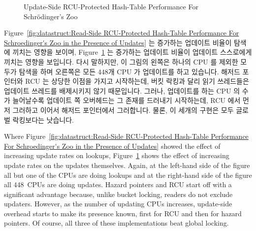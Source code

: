 \begin{figure}[tb]
\centering
{}
\caption{Update-Side RCU-Protected Hash-Table Performance For Schr\"odinger's Zoo}
\label{fig:datastruct:Update-Side RCU-Protected Hash-Table Performance For Schroedinger's Zoo}
\end{figure}

Figure~\ref{fig:datastruct:Read-Side RCU-Protected Hash-Table Performance For Schroedinger's Zoo in the Presence of Updates}
는 증가하는 업데이트 비율이 탐색에 끼치는 영향을 보이며,
Figure~\ref{fig:datastruct:Update-Side RCU-Protected Hash-Table Performance For Schroedinger's Zoo}
는 증가하는 업데이트 비율이 업데이트 스스로에게 끼치는 영향을 보입니다.
다시 말하지만, 이 그림의 왼쪽은 하나의 CPU 를 제외한 모두가 탐색을 하며
오른쪽은 모든 448개 CPU 가 업데이트를 하고 있습니다.
해저드 포인터와 RCU 는 상당한 이점을 가지고 시작하는데, 버킷 락킹과 달리 읽기
쓰레드들은 업데이트 쓰레드를 배제시키지 않기 때문입니다.
그러나, 업데이트를 하는 CPU 의 수가 늘어날수록 업데이트 쪽 오버헤드는 그 존재를
드러내기 시작하는데, RCU 에서 먼저 그러하고 이어서 해저드 포인터에서
그러합니다.
물론, 이 세개의 구현은 모두 글로벌 락킹보다는 낫습니다.

\iffalse

Where
Figure~\ref{fig:datastruct:Read-Side RCU-Protected Hash-Table Performance For Schroedinger's Zoo in the Presence of Updates}
showed the effect of increasing update rates on lookups,
Figure~\ref{fig:datastruct:Update-Side RCU-Protected Hash-Table Performance For Schroedinger's Zoo}
shows the effect of increasing update rates on the updates themselves.
Again, at the left-hand side of the figure all but one of the CPUs are
doing lookups and at the right-hand side of the figure all 448~CPUs are
doing updates.
Hazard pointers and RCU start off with a significant advantage because,
unlike bucket locking, readers do not exclude updaters.
However, as the number of updating CPUs increases, update-side overhead
starts to make its presence known, first for RCU and then for hazard
pointers.
Of course, all three of these implementations beat global locking.

